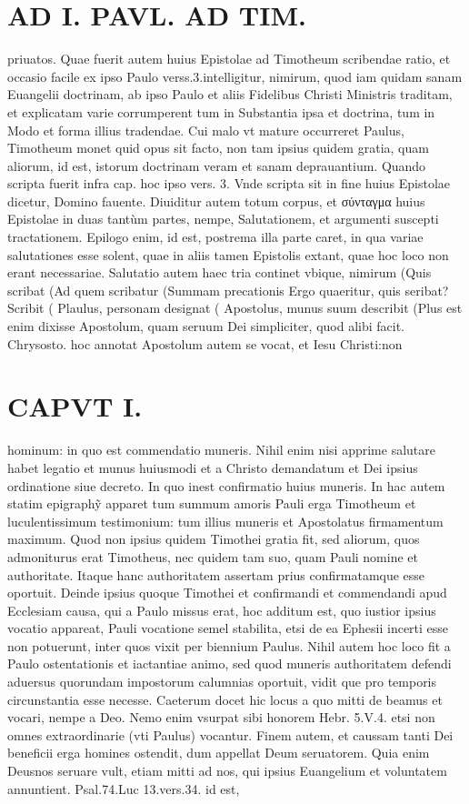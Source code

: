 \documentclass{article}
\begin{document}
\begin{pages}
\section*{AD I. PAVL. AD TIM. }
\marginpar{[ p.2 ]}\pstart priuatos. Quae fuerit autem huius Epistolae ad Timotheum scribendae ratio, et occasio facile ex ipso Paulo verss.3.intelligitur, nimirum, quod iam quidam sanam Euangelii doctrinam, ab ipso Paulo et aliis Fidelibus Christi Ministris traditam, et explicatam varie corrumperent tum in Substantia ipsa et doctrina, tum in Modo et forma illius tradendae. Cui malo vt mature occurreret Paulus, Timotheum monet quid opus sit facto, non tam ipsius quidem gratia, quam aliorum, id est, istorum doctrinam veram et sanam deprauantium. Quando scripta fuerit infra cap. hoc ipso vers. 3. Vnde scripta sit in fine huius Epistolae dicetur, Domino fauente. Diuiditur autem totum corpus, et σύνταγμα huius Epistolae in duas tantùm partes, nempe, Salutationem, et argumenti suscepti tractationem. Epilogo enim, id est, postrema illa parte caret, in qua variae salutationes esse solent, quae in aliis tamen Epistolis extant, quae hoc loco non erant necessariae. Salutatio autem haec tria continet vbique, nimirum (Quis scribat (Ad quem scribatur (Summam precationis Ergo quaeritur, quis seribat? Scribit ( Plaulus, personam designat ( Apostolus, munus suum describit (Plus est enim dixisse Apostolum, quam seruum Dei simpliciter, quod alibi facit. Chrysosto. hoc annotat Apostolum autem se vocat, et Iesu Christi:non  \pend
\section*{CAPVT I. }
\marginpar{[ p.3 ]}\pstart hominum: in quo est commendatio muneris. Nihil enim nisi apprime salutare habet legatio et munus huiusmodi et a Christo demandatum et Dei ipsius ordinatione siue decreto. In quo inest confirmatio huius muneris. In hac autem statim epigraphỹ apparet tum summum amoris Pauli erga Timotheum et luculentissimum testimonium: tum illius muneris et Apostolatus firmamentum maximum. Quod non ipsius quidem Timothei gratia fit, sed aliorum, quos admoniturus erat Timotheus, nec quidem tam suo, quam Pauli nomine et authoritate. Itaque hanc authoritatem assertam prius confirmatamque esse oportuit. Deinde ipsius quoque Timothei et confirmandi et commendandi apud Ecclesiam causa, qui a Paulo missus erat, hoc additum est, quo iustior ipsius vocatio appareat, Pauli vocatione semel stabilita, etsi de ea Ephesii incerti esse non potuerunt, inter quos vixit per biennium Paulus. Nihil autem hoc loco fit a Paulo ostentationis et iactantiae animo, sed quod muneris authoritatem defendi aduersus quorundam impostorum calumnias oportuit, vidit que pro temporis circunstantia esse necesse. Caeterum docet hic locus a quo mitti de beamus et vocari, nempe a Deo. Nemo enim vsurpat sibi honorem Hebr. 5.V.4. etsi non omnes extraordinarie (vti Paulus) vocantur.  \pend\pstart Finem autem, et caussam tanti Dei beneficii erga homines ostendit, dum appellat Deum seruatorem. Quia enim Deusnos seruare vult, etiam mitti ad nos, qui ipsius Euangelium et voluntatem annuntient. Psal.74.Luc 13.vers.34. id est,  \pend

\end{pages}
\end{document}
